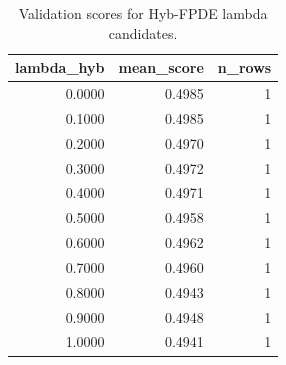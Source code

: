 \begin{table}[t]
\caption{Validation scores for Hyb-FPDE lambda candidates.}
\label{tab:lambda_distribution_computed}
\centering
\begin{tabular}{rrr}
\toprule
lambda\_hyb & mean\_score & n\_rows \\
\midrule
0.0000 & 0.4985 & 1 \\
0.1000 & 0.4985 & 1 \\
0.2000 & 0.4970 & 1 \\
0.3000 & 0.4972 & 1 \\
0.4000 & 0.4971 & 1 \\
0.5000 & 0.4958 & 1 \\
0.6000 & 0.4962 & 1 \\
0.7000 & 0.4960 & 1 \\
0.8000 & 0.4943 & 1 \\
0.9000 & 0.4948 & 1 \\
1.0000 & 0.4941 & 1 \\
\bottomrule
\end{tabular}

\end{table}
